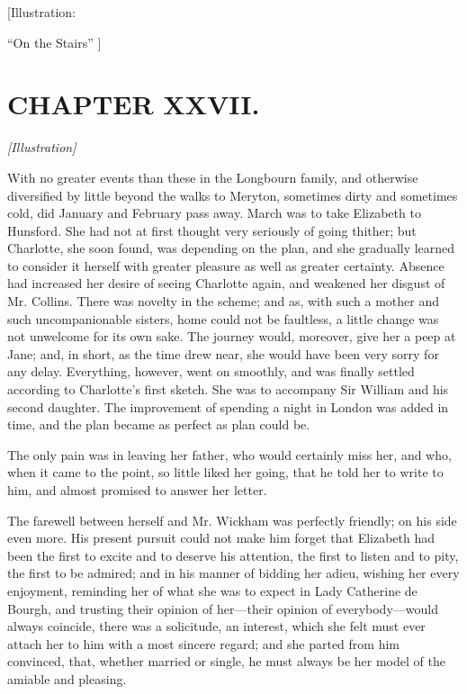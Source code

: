 \documentclass[12pt]{book}
\begin{document}
[Illustration:

``On the Stairs'' ]

\chapter{CHAPTER XXVII.}

\emph{[Illustration]}

With no greater events than these in the Longbourn family, and otherwise diversified by little beyond the walks to Meryton, sometimes dirty and sometimes cold, did January and February pass away. March was to take Elizabeth to Hunsford. She had not at first thought very seriously of going thither; but Charlotte, she soon found, was depending on the plan, and she gradually learned to consider it herself with greater pleasure as well as greater certainty. Absence had increased her desire of seeing Charlotte again, and weakened her disgust of Mr. Collins. There was novelty in the scheme; and as, with such a mother and such uncompanionable sisters, home could not be faultless, a little change was not unwelcome for its own sake. The journey would, moreover, give her a peep at Jane; and, in short, as the time drew near, she would have been very sorry for any delay. Everything, however, went on smoothly, and was finally settled according to Charlotte's first sketch. She was to accompany Sir William and his second daughter. The improvement of spending a night in London was added in time, and the plan became as perfect as plan could be.

The only pain was in leaving her father, who would certainly miss her, and who, when it came to the point, so little liked her going, that he told her to write to him, and almost promised to answer her letter.

The farewell between herself and Mr. Wickham was perfectly friendly; on his side even more. His present pursuit could not make him forget that Elizabeth had been the first to excite and to deserve his attention, the first to listen and to pity, the first to be admired; and in his manner of bidding her adieu, wishing her every enjoyment, reminding her of what she was to expect in Lady Catherine de Bourgh, and trusting their opinion of her---their opinion of everybody---would always coincide, there was a solicitude, an interest, which she felt must ever attach her to him with a most sincere regard; and she parted from him convinced, that, whether married or single, he must always be her model of the amiable and pleasing.
\end{document}
